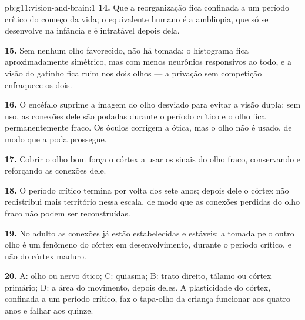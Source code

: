 \begin{solution}{pb:g11:vision-and-brain:1}
\textbf{14.} Que a reorganização fica confinada a um período crítico do
começo da vida; o equivalente humano é a ambliopia, que só se
desenvolve na infância e é intratável depois dela.

\textbf{15.} Sem nenhum olho favorecido, não há tomada: o histograma
fica aproximadamente simétrico, mas com menos neurônios responsivos ao
todo, e a visão do gatinho fica ruim nos dois olhos --- a privação sem
competição enfraquece os dois.

\textbf{16.} O encéfalo suprime a imagem do olho desviado para evitar a
visão dupla; sem uso, as conexões dele são podadas durante o período
crítico e o olho fica permanentemente fraco. Os óculos corrigem a
ótica, mas o olho não é usado, de modo que a poda prossegue.

\textbf{17.} Cobrir o olho bom força o córtex a usar os sinais do olho
fraco, conservando e reforçando as conexões dele.

\textbf{18.} O período crítico termina por volta dos sete anos; depois
dele o córtex não redistribui mais território nessa escala, de modo que
as conexões perdidas do olho fraco não podem ser reconstruídas.

\textbf{19.} No adulto as conexões já estão estabelecidas e estáveis; a
tomada pelo outro olho é um fenômeno do córtex em desenvolvimento,
durante o período crítico, e não do córtex maduro.

\textbf{20.} A: olho ou nervo ótico; C: quiasma; B: trato direito,
tálamo ou córtex primário; D: a área do movimento, depois deles. A
plasticidade do córtex, confinada a um período crítico, faz o
tapa-olho da criança funcionar aos quatro anos e falhar aos quinze.
\end{solution}
